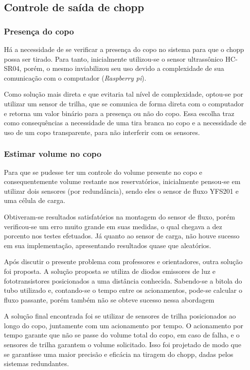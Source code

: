 \subsection{Controle de saída de chopp}

\subsubsection{Presença do copo}
Há a necessidade de se verificar a presença do copo no sistema para que o chopp possa ser tirado. 
Para tanto, inicialmente utilizou-se o sensor ultrassônico HC-SR04, porém, o mesmo inviabilizou seu
uso devido a complexidade de sua comunicação com o computador (\textit{Raspberry pi}).

Como solução mais direta e que evitaria tal nível de complexidade, optou-se por utilizar um sensor de trilha, 
que se comunica de forma direta com o computador e retorna um valor binário para a presença ou não do copo. 
Essa escolha traz como consequências a necessidade de uma tira branca no copo
 e a necessidade de uso de um copo transparente, para não interferir com os sensores.


\subsubsection{Estimar volume no copo}
Para que se pudesse ter um controle do volume presente no copo e consequentemente volume 
restante nos reservatórios, inicialmente pensou-se em utilizar dois sensores (por redundância), 
sendo eles o sensor de fluxo YFS201 e uma célula de carga.

Obtiveram-se resultados satisfatórios na montagem do sensor de fluxo, porém verificou-se um erro 
muito grande em suas medidas, o qual chegava a dez porcento nos testes efetuados. 
Já quanto ao sensor de carga, não houve sucesso em sua implementação, apresentando resultados quase que aleatórios.

Após discutir o presente problema com professores e orientadores, outra solução foi proposta.
A solução proposta se utiliza de diodos emissores de luz e fototransistores posicionados a 
uma distância conhecida. Sabendo-se a bitola do tubo utilizado e, contando-se o tempo entre 
os acionamentos, pode-se calcular o fluxo passante, porém também não se obteve sucesso nessa abordagem

A solução final encontrada foi se utilizar de sensores de trilha posicionados ao longo do copo, juntamente com um acionamento 
por tempo. O acionamento por tempo garante que não se passe do volume total do copo, em caso de falha,
e o sensores de trilha garantem o volume solicitado. Isso foi projetado de modo que se garantisse uma maior precisão e eficácia
na tiragem do chopp, dadas pelos sistemas redundantes.


